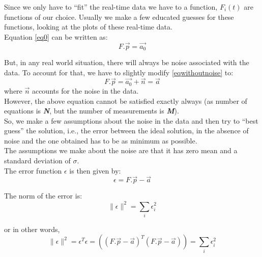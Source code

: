 \documentclass[11pt, a4paper]{article}
\begin{document}
         Since we only have to ``fit'' the real-time data we have to a function, $F_i(t)$ are functions of our choice. Usually we make a few educated guesses for these functions, looking at the plots of these real-time data.\\

         Equation \eqref{eq0} can be written as:
        \begin{equation}
            F.\vec{p} = \vec{a_0}
            \label{eqwithoutnoise}
        \end{equation}

        But, in any real world situation, there will always be noise associated with the data. To account for that, we have to slightly modify \eqref{eqwithoutnoise} to:
        \begin{equation}
            F.\vec{p} = \vec{a_0}+\vec{n} = \vec{a}
            \label{truenoiseeqn}
        \end{equation}
        where $\vec{n}$ accounts for the noise in the data.\\

        However, the above equation cannot be satisfied exactly always (as number of equations is \textbf{\textit{N}}, but the number of measurements is \textbf{\textit{M}}).\\

        So, we make a few assumptions about the noise in the data and then try to ``best guess'' the solution, i.e., the error between the ideal solution, in the absence of noise and the one obtained has to be as minimum as possible.\\

        The assumptions we make about the noise are that it has zero mean and a standard deviation of $\sigma$.\\

        The error function $\epsilon$ is then given by:
        \begin{equation}
            \epsilon = F.\vec{p} - \vec{a}
        \end{equation}

        The norm of the error is:
        \begin{equation}
            \|\epsilon\|^2 = \sum_{i}\epsilon_i^2
        \end{equation}

        or in other words,\\
        \begin{equation}
            \|\epsilon\|^2 = \epsilon^T\epsilon = ((F.\vec{p}-\vec{a})^T(F.\vec{p}-\vec{a})) = \sum_{i}\epsilon_i^2
        \end{equation}
\end{document}
